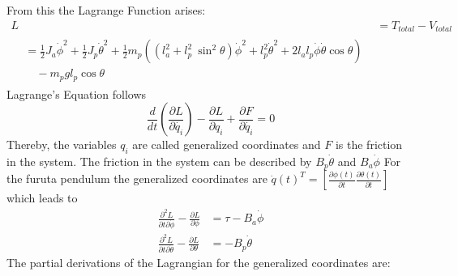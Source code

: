 From this the Lagrange Function arises:
\begin{align*}
L &=T_{total}-V_{total}\\
\begin{split}&=\frac{1}{2}J_a\dot{\phi}^2+\frac{1}{2}J_p\dot{\theta}^2+\frac{1}{2}m_p\left((l_a^2+l_p^2\
\sin^2\theta)\dot{\phi}^2+l_p^2\dot{\theta}^2+2l_al_p\dot{\phi}\dot{\theta}\cos 
\theta\right) \\&\quad - m_pgl_{p}\cos\theta\end{split}
\end{align*}
 Lagrange's 
Equation follows \[ 
\frac{d}{dt}\left(\frac{\partial L}{\partial 
	\dot{q_i}}\right)-\frac{\partial 
	L}{\partial 
	q_i}+\frac{\partial F}{\partial \dot{q_i}} =0\] Thereby, the variables 
	$q_i$ are called 
	generalized coordinates and $F$ is the friction in the system. 
	The friction in the system can be described by $B_p\dot{\theta}$ and $ 
	B_a\dot{\phi}$
	For 
the furuta pendulum the generalized coordinates are $\dot{q}(t)^T = 
\left[\frac{\partial 
	\phi(t)}{\partial t} \frac{\partial \theta(t)}{\partial t} \right]$ which 
	leads 
to 
\begin{align*}
\frac{\partial^2 L}{\partial t\partial \dot{\phi}}-\frac{\partial 
	L}{\partial \phi}&=\tau - B_a\dot{\phi}\\
\frac{\partial^2 L}{\partial t\partial \dot{\theta}}-\frac{\partial 
	L}{\partial \theta}&=-B_p\dot{\theta}
\end{align*}
The partial derivations of the Lagrangian for the generalized coordinates are:

